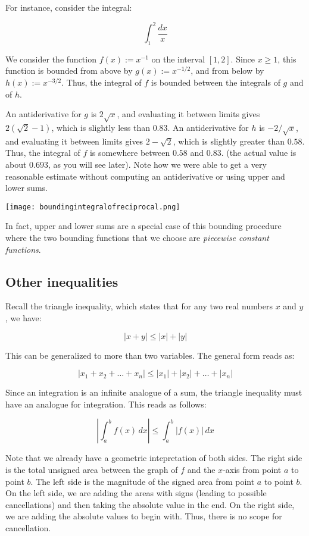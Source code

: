 \documentclass{amsart}
\begin{document}
For instance, consider the integral:

$$\int_1^2 \frac{dx}{x}$$

We consider the function $f(x) := x^{-1}$ on the interval
$[1,2]$. Since $x \ge 1$, this function is bounded from above by $g(x)
:= x^{-1/2}$, and from below by $h(x) := x^{-3/2}$. Thus, the integral
of $f$ is bounded between the integrals of $g$ and of $h$.

An antiderivative for $g$ is $2\sqrt{x}$, and evaluating it between
limits gives $2(\sqrt{2} - 1)$, which is slightly less than $0.83$. An
antiderivative for $h$ is $-2/\sqrt{x}$, and evaluating it between
limits gives $2 - \sqrt{2}$, which is slightly greater than
$0.58$. Thus, the integral of $f$ is somewhere between $0.58$ and
$0.83$. (the actual value is about $0.693$, as you will see later). Note
how we were able to get a very reasonable estimate without computing
an antiderivative or using upper and lower sums.

\texttt{[image: boundingintegralofreciprocal.png]}

In fact, upper and lower sums are a special case of this bounding
procedure where the two bounding functions that we choose are {\em
piecewise constant functions}.

\subsection{Other inequalities}

Recall the triangle inequality, which states that for any two real
numbers $x$ and $y$, we have:

$$|x + y| \le |x| + |y|$$

This can be generalized to more than two variables. The general form
reads as:

$$|x_1 + x_2 + \dots + x_n| \le |x_1| + |x_2| + \dots + |x_n|$$

Since an integration is an infinite analogue of a sum, the triangle
inequality must have an analogue for integration. This reads as follows:

$$\left | \int_a^b f(x) \, dx \right| \le \int_a^b |f(x)| \, dx$$

Note that we already have a geometric intepretation of both sides. The
right side is the total unsigned area between the graph of $f$ and the
$x$-axis from point $a$ to point $b$. The left side is the magnitude
of the signed area from point $a$ to point $b$. On the left side, we
are adding the areas with signs (leading to possible cancellations)
and then taking the absolute value in the end. On the right side, we
are adding the absolute values to begin with. Thus, there is no scope
for cancellation.
\end{document}
